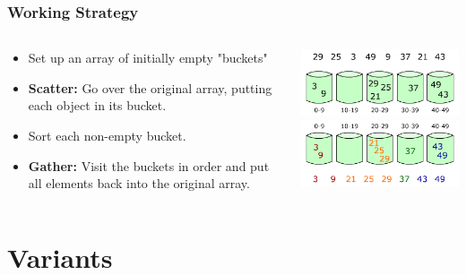 \documentclass{beamer}
\begin{document}
  \begin{frame}
	\frametitle{Working Strategy}
  \begin{columns}
		\begin{column}{0.5\textwidth}

			\begin{itemize}
		\item Set up an array of initially empty "buckets"
		\pause\item \textbf{Scatter:} Go over the original array, putting each object in its bucket.
		\pause\item Sort each non-empty bucket.
		\pause\item \textbf{Gather:} Visit the buckets in order and put all elements back into the original array.
		
	\end{itemize}
		\end{column}
		\pause
		\begin{column}{0.5\textwidth}
			\includegraphics[width=1.1\columnwidth]{Bucket_sort_1.png}\\
			\includegraphics[width=1.1\columnwidth]{Bucket_sort_2.png}
		\end{column}
	\end{columns}
	
\end{frame}


\section{Variants}
\end{document}
